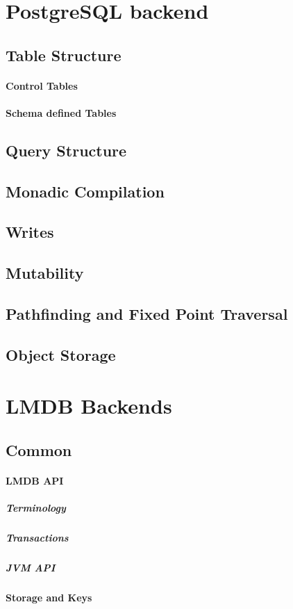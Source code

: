 \documentclass[12pt,a4paper,twoside,openright]{report}
\begin{document}
{\section{PostgreSQL backend}
	\subsection{Table Structure}
		\paragraph{Control Tables}
		\paragraph{Schema defined Tables}
	\subsection{Query Structure}
	\subsection{Monadic Compilation}
	\subsection{Writes}
	\subsection{Mutability}
	\subsection{Pathfinding and Fixed Point Traversal}
	\subsection{Object Storage}

\section{LMDB Backends}
	\subsection{Common}
		\paragraph{LMDB API}
			\subparagraph{Terminology}
			\subparagraph{Transactions}
			\subparagraph{JVM API}
		\paragraph{Storage and Keys}
}
\end{document}
